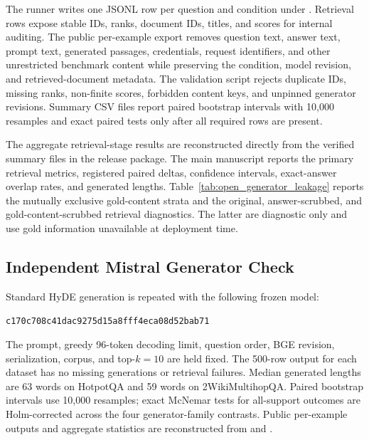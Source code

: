 \documentclass[pdflatex,sn-basic,Numbered]{sn-jnl}
\begin{document}
The runner writes one JSONL row per question and condition under . Retrieval rows expose stable IDs, ranks, document IDs, titles, and scores for internal auditing. The public per-example export removes question text, answer text, prompt text, generated passages, credentials, request identifiers, and other unrestricted benchmark content while preserving the condition, model revision, and retrieved-document metadata. The validation script rejects duplicate IDs, missing ranks, non-finite scores, forbidden content keys, and unpinned generator revisions. Summary CSV files report paired bootstrap intervals with 10,000 resamples and exact paired tests only after all required rows are present.

The aggregate retrieval-stage results are reconstructed directly from the verified summary files in the release package. The main manuscript reports the primary retrieval metrics, registered paired deltas, confidence intervals, exact-answer overlap rates, and generated lengths. Table~\ref{tab:open_generator_leakage} reports the mutually exclusive gold-content strata and the original, answer-scrubbed, and gold-content-scrubbed retrieval diagnostics. The latter are diagnostic only and use gold information unavailable at deployment time.

\subsection{Independent Mistral Generator Check}

Standard HyDE generation is repeated with the following frozen model:
\begin{center}
\small{}\par
{\scriptsize\texttt{c170c708c41dac9275d15a8fff4eca08d52bab71}}
\end{center}
The prompt, greedy 96-token decoding limit, question order, BGE revision, serialization, corpus, and top-$k=10$ are held fixed. The 500-row output for each dataset has no missing generations or retrieval failures. Median generated lengths are 63 words on HotpotQA and 59 words on 2WikiMultihopQA. Paired bootstrap intervals use 10,000 resamples; exact McNemar tests for all-support outcomes are Holm-corrected across the four generator-family contrasts. Public per-example outputs and aggregate statistics are reconstructed from  and .
\end{document}
